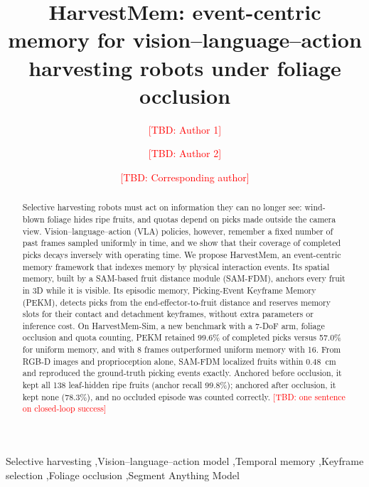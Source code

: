 \documentclass[preprint,12pt,authoryear]{elsarticle}
\newcommand{\tbd}[1]{\textcolor{red}{[TBD: #1]}}
\begin{document}
\begin{frontmatter}

\title{HarvestMem: event-centric memory for vision--\hspace{0pt}language--\hspace{0pt}action harvesting robots under foliage occlusion}

\author[a]{\tbd{Author 1}}
\author[a]{\tbd{Author 2}}
\author[a]{\tbd{Corresponding author}}
\cortext[cor1]{Corresponding author. E-mail: \tbd{email}}
\address[a]{\tbd{Affiliation, city, postcode, country}}

\begin{abstract}
Selective harvesting robots must act on information they can no longer see: wind-blown foliage hides ripe fruits, and quotas depend on picks made outside the camera view. Vision--language--action (VLA) policies, however, remember a fixed number of past frames sampled uniformly in time, and we show that their coverage of completed picks decays inversely with operating time. We propose HarvestMem, an event-centric memory framework that indexes memory by physical interaction events. Its spatial memory, built by a SAM-based fruit distance module (SAM-FDM), anchors every fruit in 3D while it is visible. Its episodic memory, Picking-Event Keyframe Memory (PEKM), detects picks from the end-effector-to-fruit distance and reserves memory slots for their contact and detachment keyframes, without extra parameters or inference cost. On HarvestMem-Sim, a new benchmark with a 7-DoF arm, foliage occlusion and quota counting, PEKM retained 99.6\% of completed picks versus 57.0\% for uniform memory, and with 8 frames outperformed uniform memory with 16. From RGB-D images and proprioception alone, SAM-FDM localized fruits within 0.48~cm and reproduced the ground-truth picking events exactly. Anchored before occlusion, it kept all 138 leaf-hidden ripe fruits (anchor recall 99.8\%); anchored after occlusion, it kept none (78.3\%), and no occluded episode was counted correctly. \tbd{one sentence on closed-loop success}
\end{abstract}


\begin{keyword}
Selective harvesting \sep Vision--language--action model \sep Temporal memory \sep Keyframe selection \sep Foliage occlusion \sep Segment Anything Model
\end{keyword}

\end{frontmatter}
\end{document}
